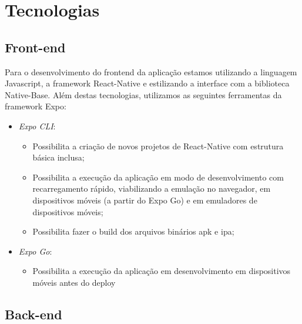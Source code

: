 \chapter{Tecnologias}

\section{Front-end}
Para o desenvolvimento do \gls{frontend} da aplicação estamos utilizando a linguagem Javascript, a \gls{framework} React-Native e estilizando a interface com a biblioteca Native-Base.
Além destas tecnologias, utilizamos as seguintes ferramentas da \gls{framework} Expo:

\begin{itemize}
	\item \textit{Expo CLI}:
		\begin{itemize}
			\item Possibilita a criação de novos projetos de React-Native com estrutura básica inclusa;
			\item Possibilita a execução da aplicação em modo de desenvolvimento com recarregamento rápido, viabilizando a emulação no navegador, em dispositivos móveis (a partir do Expo Go) e em emuladores de dispositivos móveis;
			
			\item Possibilita fazer o \gls{build} dos arquivos binários apk e ipa;
		\end{itemize}
		
			\item \textit{Expo Go}:
		\begin{itemize}
			\item Possibilita a execução da aplicação em desenvolvimento em dispositivos móveis antes do \gls{deploy}
		\end{itemize}
\end{itemize}

\section{Back-end}